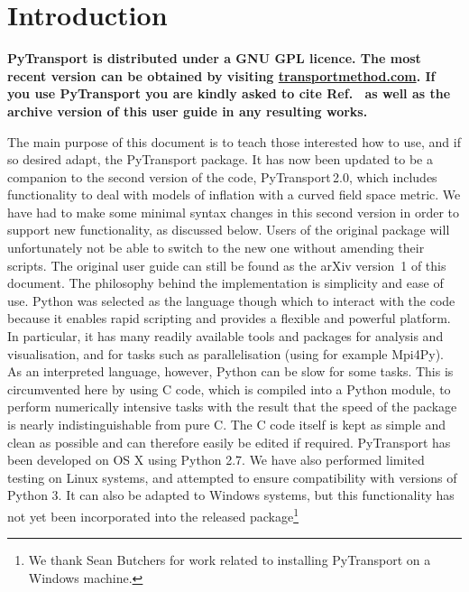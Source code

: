 \documentclass[10pt,
amsmath,amssymb,
aps,prd,nofootinbib,eqsecnum,a4paper]{revtex4}
\newcommand{\CC}{C\nolinebreak\hspace{-.05em}\raisebox{.4ex}{\tiny\bf +}\nolinebreak\hspace{-.10em}\raisebox{.4ex}{\tiny\bf +}}
\def\CC{{C\nolinebreak[4]\hspace{-.05em}\raisebox{.4ex}{\tiny\bf ++}}}
\def\S{ }
\begin{document}
\section{Introduction}

\begin{framed}
{\bf \noindent PyTransport is distributed under a GNU GPL licence. The most recent version can be obtained by visiting \href{https://transportmethod.com}{transportmethod.com}. If you use PyTransport you are kindly asked to cite Ref.~\cite{Dias:2016rjq}  as well as the archive version of this user guide in any resulting works. }
\end{framed}

The main purpose of this document is to teach those interested how to use, and if so desired adapt, 
the PyTransport package. It has now been updated  to 
be a companion to the second version of the code, 
PyTransport\,2.0, which includes functionality to deal with models of inflation with a curved 
field space metric. We have had to make some minimal syntax changes in this second version 
in order to support new functionality, as discussed below. Users of the original package 
will unfortunately not be able to switch to the new one without amending their scripts. The original user guide 
can still be found as the arXiv version~1 of this document.
The philosophy behind the implementation is simplicity and ease of use. 
Python was selected as the 
language though which to interact with the code because it enables rapid scripting and provides a flexible 
and powerful platform. 
In particular, it has many readily available tools and packages for analysis and visualisation, and for tasks such as parallelisation  (using for example Mpi4Py).  
As an interpreted language, however, Python can be slow for some tasks. This is circumvented here by 
using \CC \S  code, 
which is compiled into a Python module, to perform numerically intensive tasks with the result that the speed 
of the package is nearly indistinguishable from pure \CC. The \CC \S  code itself is kept as simple and 
clean as possible and can therefore easily be edited if required. PyTransport has been developed on 
OS X 
using Python 2.7. We have also performed limited testing on Linux systems, and 
attempted to ensure compatibility with versions of Python 3. 
It can also be adapted to Windows systems, but this functionality has not yet been incorporated into 
the released package\footnote{We thank Sean Butchers for work related to installing PyTransport on a 
Windows machine.}
\end{document}
